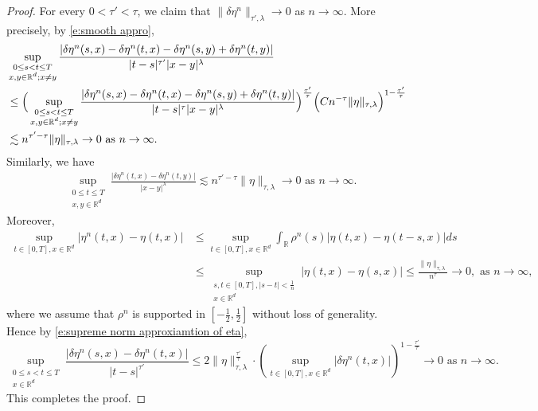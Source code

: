 \documentclass[11pt,reqno]{amsart}
\numberwithin{equation}{section}
\begin{document}
\begin{proof}
For every $0<\tau'<\tau$, we claim that $\|\delta\eta^{n}\|_{\tau',\lambda}\rightarrow 0$ as $n\rightarrow \infty$. More precisely, by \eqref{e:smooth appro}, 
\begin{equation*}
\begin{aligned}	
&\sup _{\substack{0 \leq s<t \leq T \\ x, y \in \mathbb{R}^{d} ; x \neq y}} \frac{|\delta \eta^{n}(s, x)-\delta \eta^{n}(t, x)-\delta\eta^{n}(s, y)+\delta \eta^{n}(t, y)|}{|t-s|^{\tau'}|x-y|^{\lambda}} \notag \\
&\le  \Big(\sup _{\substack{0 \leq s<t \leq T \\ x, y \in \mathbb{R}^{d} ; x \neq y}} \frac{|\delta \eta^{n}(s, x)-\delta \eta^{n}(t, x)-\delta\eta^{n}(s, y) + \delta \eta^{n}(t, y)|}{|t-s|^{\tau}|x-y|^{\lambda}}\Big)^{ \frac{\tau'}{\tau}} \Big(Cn^{-\tau}\|\eta\|_{\tau,\lambda}\Big)^{1 - \frac{\tau'}{\tau}}\\		
&\lesssim  n^{\tau' - \tau} \|\eta\|_{\tau,\lambda} \to 0 \text{ as } n\to \infty.
\end{aligned}
\end{equation*}
Similarly, we have
\begin{align*}
&\sup _{\substack{0 \leq t \leq T \\ x ,y\in \mathbb{R}^{d}}} \frac{|\delta \eta^{n}(t, x)-\delta \eta^{n}(t, y)|}{|x-y|^{\lambda}}\lesssim n^{\tau' - \tau}\|\eta\|_{\tau,\lambda} \to 0 \text{ as } n\to \infty.	
\end{align*}
Moreover, 
\begin{equation}\label{e:supreme norm approxiamtion of eta}
\begin{aligned}
\sup_{t\in[0,T],x\in\mathbb{R}^{d}}|\eta^{n}(t,x) - \eta(t,x)|
&\le \sup_{t\in[0,T],x\in\mathbb{R}^{d}}\int_{\mathbb{R}}\rho^{n}(s)|\eta(t,x) - \eta(t-s,x)|ds\\
&\le \sup_{\substack{s,t\in[0,T],|s-t|<\frac{1}{n}\\ x\in\mathbb{R}^{d}}}|\eta(t,x) - \eta(s,x)| \le \frac{\|\eta\|_{\tau,\lambda}}{n^{\tau}}\to 0, \text{ as } n \to \infty,
\end{aligned}
\end{equation}
where we assume that $\rho^{n}$ is supported in $[-\frac{1}{2}, \frac{1}{2}]$ without loss of generality. 
Hence by \eqref{e:supreme norm approxiamtion of eta}, 
\begin{equation*}
\sup _{\substack{0 \leq s<t \leq T \\ x \in \mathbb{R}^{d}}} \frac{|\delta \eta^{n}(s, x)-\delta \eta^{n}(t, x)|}{|t-s|^{\tau'}} \le 2 \|\eta\|^{\frac{\tau'}{\tau}}_{\tau,\lambda}\cdot\left(\sup_{t\in[0,T],x\in\mathbb{R}^{d}}|\delta\eta^{n}(t,x)|\right)^{1 - \frac{\tau'}{\tau}}\rightarrow0 \text{ as }n\rightarrow\infty.
\end{equation*}
This completes the proof. 
\end{proof}
\end{document}
